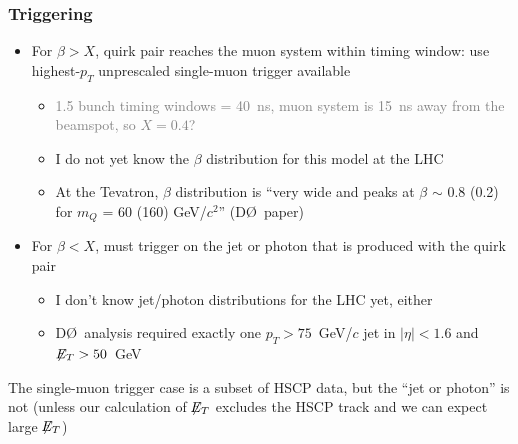 \documentclass[compress]{beamer}
\begin{document}
\begin{frame}
\frametitle{Triggering}

\begin{itemize}
\item For $\beta > X$, quirk pair reaches the muon system within timing window: use highest-$p_T$ unprescaled single-muon trigger available
\begin{itemize}
\item \textcolor{gray}{1.5 bunch timing windows = 40~ns, muon system is 15~ns away from the beamspot, so $X = 0.4$?}
\item I do not yet know the $\beta$ distribution for this model at the LHC
\item At the Tevatron, $\beta$ distribution is ``very wide and peaks at $\beta$ $\sim$ 0.8 (0.2) for $m_Q$ = 60 (160) GeV/$c^2$'' (D\O\ paper)
\end{itemize}

\item For $\beta < X$, must trigger on the jet or photon that is produced with the quirk pair
\begin{itemize}
\item I don't know jet/photon distributions for the LHC yet, either
\item D\O\ analysis required exactly one $p_T > 75$~GeV/$c$ jet in $|\eta| < 1.6$ and $\not\!\!{E_{T}} > 50$~GeV

\end{itemize}
\end{itemize}

The single-muon trigger case is a subset of HSCP data, but the ``jet or photon'' is not (unless our calculation of $\not\!\!{E_{T}}$ excludes the HSCP track and we can expect large $\not\!\!{E_{T}}$)

\end{frame}
\end{document}
